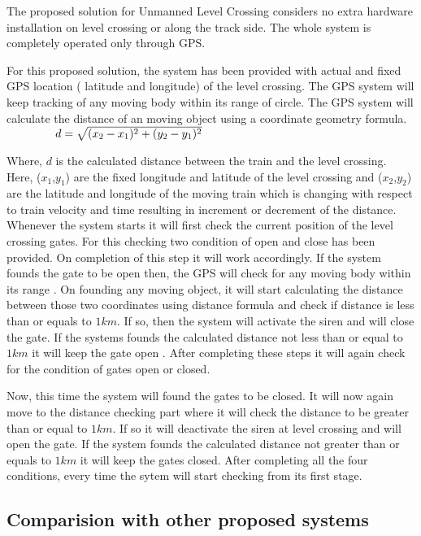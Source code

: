 \documentclass{llncs}
\begin{document}
The proposed solution for Unmanned Level Crossing considers no extra hardware installation on level crossing or along the track side. The whole system is completely operated only through GPS.

For this proposed solution, the system has been provided with actual and fixed GPS location ( latitude and longitude) of the level crossing. The GPS system will keep tracking of any moving body within its range of circle. The GPS system will calculate the distance of an moving object using a coordinate geometry formula.\\


$ \hspace{1.5cm} d= \sqrt{( x_{2}- x_{1})^{2}+ ( y_{2}- y_{1})^{2}}\\$


Where, $d$ is the calculated distance between the train and the level crossing. Here, ($x_{1}$,$y_{1}$) are the fixed longitude and latitude of the level crossing and ($x_{2}$,$y_{2}$) are the latitude and longitude of the moving train which is changing with respect to train velocity and time resulting in increment or decrement of the distance.
Whenever the system starts it will first check the current position of the level crossing gates. For this checking two condition of open and close has been provided. On completion of this step it will work accordingly. If the system founds the gate to be open then, the GPS will check for any moving body within its range . On founding any moving object, it will start calculating the distance between those two coordinates using distance formula and check if distance is less than or equals to $1km$. If so, then the system will activate the siren and will close the gate. If the systems founds the calculated distance not less than or equal to $1km$ it will keep the gate open . After completing these steps it will again check for the condition of gates open or closed.

Now, this time the system will found the gates to be closed. It will now again move to the distance checking part where it will check the distance to be greater than or equal to $1km$. If so it will deactivate the siren at level crossing and will open the gate. If the system founds the calculated distance not greater than or equals to $1km$ it will keep the gates closed. After completing all the four conditions, every time the sytem will start checking from its first stage.\\

\subsection{Comparision with other proposed systems}
\end{document}
